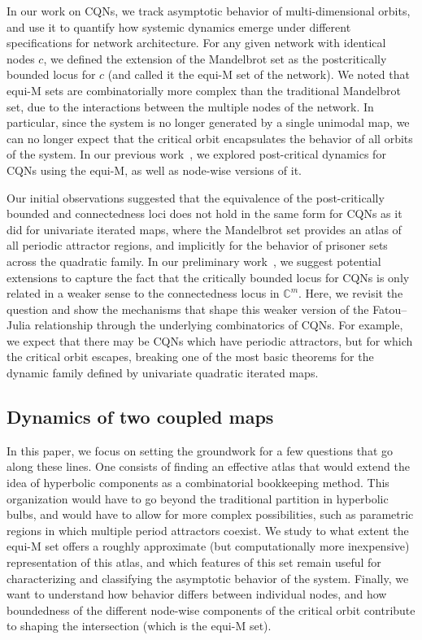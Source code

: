 \documentclass[10pt]{article}
\begin{document}
In our work on CQNs, we track asymptotic behavior of multi-dimensional orbits, and use it to quantify how systemic dynamics emerge under different specifications for network architecture. For any given network with identical nodes $c$, we defined the extension of the Mandelbrot set as the postcritically bounded locus for $c$ (and called it the equi-M set of the network). We noted that equi-M sets are combinatorially more complex than the traditional Mandelbrot set, due to the interactions between the multiple nodes of the network. In particular, since the system is no longer generated by a single unimodal map, we can no longer expect that the critical orbit encapsulates the behavior of all orbits of the system. In our previous work~\cite{Ariel,Simone,AC2,DTI}, we explored post-critical dynamics for CQNs
using the equi-M, as well as node-wise versions of it.

Our initial observations suggested that the equivalence of the post-critically bounded and connectedness loci does not hold in the same form for CQNs as it did for univariate iterated maps, where the Mandelbrot set provides an atlas of all periodic attractor regions, and implicitly for the behavior of prisoner sets across the quadratic family. In our preliminary work~\cite{Simone}, we suggest potential extensions to capture the fact that the critically bounded locus for CQNs is only related in a weaker sense to the connectedness locus in $\mathbb{C}^m$. Here, we revisit the question and show the mechanisms that shape this weaker version of the Fatou--Julia relationship through the underlying combinatorics of CQNs. For example, we expect that there may be CQNs which have periodic attractors, but for which the critical orbit escapes, breaking one of the most basic theorems for the dynamic family defined by univariate quadratic iterated maps. %

\subsection{Dynamics of two coupled maps}

In this paper, we focus on setting the groundwork for a few questions that go along these lines. One consists of finding an effective atlas that would extend the idea of hyperbolic components as a combinatorial bookkeeping method. This organization would have to go beyond the traditional partition in hyperbolic bulbs, and would have to allow for more complex possibilities, such as parametric regions in which multiple period attractors coexist. We study to what extent the equi-M set offers a roughly approximate (but computationally more inexpensive) representation of this atlas, and which features of this set remain useful for characterizing and classifying the asymptotic behavior of the system. Finally, we want to understand how behavior differs between individual nodes, and how boundedness of the different node-wise components of the critical orbit contribute to shaping the intersection (which is the equi-M set).
\end{document}
